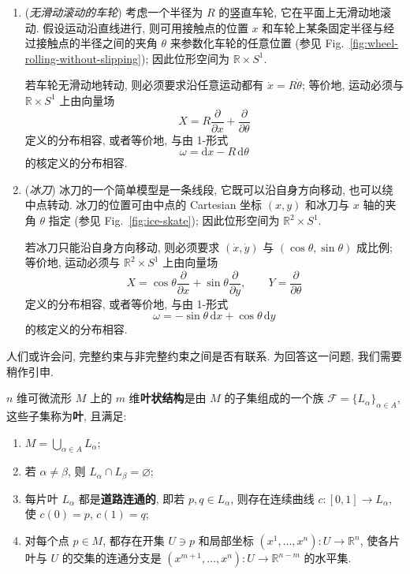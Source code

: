 \begin{RiemannExample}\label{ex:rolling-wheel-and-skate-constraints}
\begin{enumerate}[label=(\arabic*),ref=\arabic*,leftmargin=*]
\item\label{ex:wheel-rolling-without-slipping} (\emph{无滑动滚动的车轮}) 考虑一个半径为 $R$ 的竖直车轮, 它在平面上无滑动地滚动. 假设运动沿直线进行, 则可用接触点的位置 $x$ 和车轮上某条固定半径与经过接触点的半径之间的夹角 $\theta$ 来参数化车轮的任意位置 (参见 Fig.~\ref{fig:wheel-rolling-without-slipping}); 因此位形空间为 $\mathbb{R}\times S^1$.

若车轮无滑动地转动, 则必须要求沿任意运动都有 $\dot x=R\dot\theta$; 等价地, 运动必须与 $\mathbb{R}\times S^1$ 上由向量场
\[
  X=R\frac{\partial}{\partial x}+\frac{\partial}{\partial\theta}
\]
定义的分布相容, 或者等价地, 与由 1-形式
\[
  \omega=\mathrm{d}x-R\,\mathrm{d}\theta
\]
的核定义的分布相容.
\item\label{ex:ice-skate-constraint} (\emph{冰刀}) 冰刀的一个简单模型是一条线段, 它既可以沿自身方向移动, 也可以绕中点转动. 冰刀的位置可由中点的 Cartesian 坐标 $(x,y)$ 和冰刀与 $x$ 轴的夹角 $\theta$ 指定 (参见 Fig.~\ref{fig:ice-skate}); 因此位形空间为 $\mathbb{R}^2\times S^1$.

若冰刀只能沿自身方向移动, 则必须要求 $(\dot x,\dot y)$ 与 $(\cos\theta,\sin\theta)$ 成比例; 等价地, 运动必须与 $\mathbb{R}^2\times S^1$ 上由向量场
\[
  X=\cos\theta\frac{\partial}{\partial x}+\sin\theta\frac{\partial}{\partial y},
  \qquad Y=\frac{\partial}{\partial\theta}
\]
定义的分布相容, 或者等价地, 与由 1-形式
\[
  \omega=-\sin\theta\,\mathrm{d}x+\cos\theta\,\mathrm{d}y
\]
的核定义的分布相容.
\end{enumerate}
\end{RiemannExample}

人们或许会问, 完整约束与非完整约束之间是否有联系. 为回答这一问题, 我们需要稍作引申.

\begin{RiemannDefinition}\label{def:foliation}
$n$ 维可微流形 $M$ 上的 $m$ 维\textbf{叶状结构}是由 $M$ 的子集组成的一个族 $\mathcal{F}=\{L_\alpha\}_{\alpha\in A}$, 这些子集称为\textbf{叶}, 且满足:
\begin{enumerate}[label=(\arabic*),leftmargin=*]
\item $M=\bigcup_{\alpha\in A}L_\alpha$;
\item 若 $\alpha\ne\beta$, 则 $L_\alpha\cap L_\beta=\varnothing$;
\item 每片叶 $L_\alpha$ 都是\textbf{道路连通的}, 即若 $p,q\in L_\alpha$, 则存在连续曲线 $c:[0,1]\to L_\alpha$, 使 $c(0)=p$, $c(1)=q$;
\item 对每个点 $p\in M$, 都存在开集 $U\ni p$ 和局部坐标 $(x^1,\ldots,x^n):U\to\mathbb{R}^n$, 使各片叶与 $U$ 的交集的连通分支是 $(x^{m+1},\ldots,x^n):U\to\mathbb{R}^{n-m}$ 的水平集.
\end{enumerate}
\end{RiemannDefinition}

